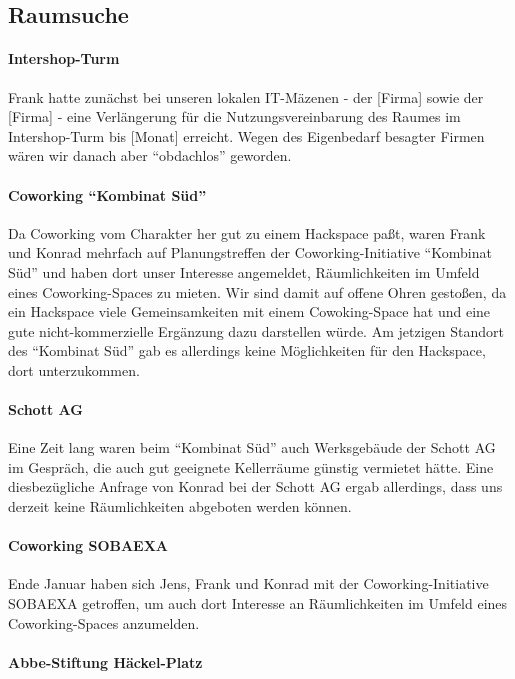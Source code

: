 \documentclass[10pt,DIV16]{scrartcl}
\begin{document}
\subsection{Raumsuche}

\paragraph{Intershop-Turm}

Frank hatte zunächst bei unseren lokalen IT-Mäzenen - der [Firma] sowie der
[Firma] - eine Verlängerung für die Nutzungsvereinbarung des Raumes im
Intershop-Turm bis [Monat] erreicht.  Wegen des Eigenbedarf besagter Firmen
wären wir danach aber "`obdachlos"' geworden.

\paragraph{Coworking ``Kombinat Süd''}

Da Coworking vom Charakter her gut zu einem Hackspace paßt, waren Frank und
Konrad mehrfach auf Planungstreffen der Coworking-Initiative "`Kombinat Süd"'
und haben dort unser Interesse angemeldet, Räumlichkeiten im Umfeld eines
Coworking-Spaces zu mieten.  Wir sind damit auf offene Ohren gestoßen, da ein
Hackspace viele Gemeinsamkeiten mit einem Cowoking-Space hat und eine gute
nicht-kommerzielle Ergänzung dazu darstellen würde.  Am jetzigen Standort des
"`Kombinat Süd"' gab es allerdings keine Möglichkeiten für den Hackspace, dort
unterzukommen.

\paragraph{Schott AG}

Eine Zeit lang waren beim "`Kombinat Süd"' auch Werksgebäude der Schott AG im
Gespräch, die auch gut geeignete Kellerräume günstig vermietet hätte.  Eine
diesbezügliche Anfrage von Konrad bei der Schott AG ergab allerdings, dass uns
derzeit keine Räumlichkeiten abgeboten werden können.

\paragraph{Coworking SOBAEXA}

Ende Januar haben sich Jens, Frank und Konrad mit der Coworking-Initiative
SOBAEXA getroffen, um auch dort Interesse an Räumlichkeiten im Umfeld eines
Coworking-Spaces anzumelden.

\paragraph{Abbe-Stiftung Häckel-Platz}
\end{document}
